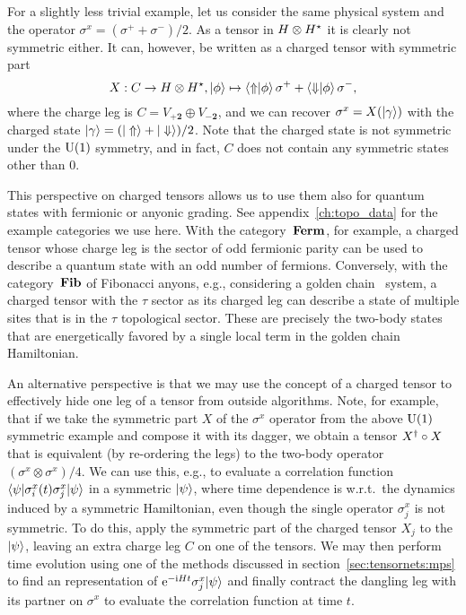 For a slightly less trivial example, let us consider the same physical system and the operator $\sigma^x = (\sigma^+ + \sigma^-) / 2$.
%
As a tensor in $H \otimes H^\star$ it is clearly not symmetric either.
%
It can, however, be written as a charged tensor with symmetric part
\begin{equation}
    X: C \to H \otimes \dualspace{H}, \ket{\phi} \mapsto \braket{\Uparrow}{\phi} \sigma^+ + \braket{\Downarrow}{\phi} \sigma^-
    ,
\end{equation}
where the charge leg is $C = V_{+\mathbf{2}} \oplus V_{-\mathbf{2}}$, and we can recover $\sigma^x = X(\ket{\gamma})$ with the charged state $\ket{\gamma} = (\ket{\Uparrow} + \ket{\Downarrow}) / 2$.
%
Note that the charged state is not symmetric under the $\mathrm{U}(1)$ symmetry, and in fact, $C$ does not contain any symmetric states other than $0$.

This perspective on charged tensors allows us to use them also for quantum states with fermionic or anyonic grading.
%
See appendix~\ref{ch:topo_data} for the example categories we use here.
%
With the category~$\mathbf{Ferm}$, for example, a charged tensor whose charge leg is the sector of odd fermionic parity can be used to describe a quantum state with an odd number of fermions.
%
Conversely, with the category~$\mathbf{Fib}$ of Fibonacci anyons, e.g., considering a golden chain~\cite{feiguin2007} system, a charged tensor with the $\tau$ sector as its charged leg can describe a state of multiple sites that is in the $\tau$ topological sector.
%
These are precisely the two-body states that are energetically favored by a single local term in the golden chain Hamiltonian.

An alternative perspective is that we may use the concept of a charged tensor to effectively hide one leg of a tensor from outside algorithms.
%
Note, for example, that if we take the symmetric part $X$ of the $\sigma^x$ operator from the above $\mathrm{U}(1)$ symmetric example and compose it with its dagger, we obtain a tensor $X^\dagger \circ X$ that is equivalent (by re-ordering the legs) to the two-body operator $(\sigma^x \otimes \sigma^x) / 4$.
%
We can use this, e.g., to evaluate a correlation function $\braopket{\psi}{\sigma^x_i(t) \sigma^x_j}{\psi}$ in a symmetric  $\psiket$, where time dependence is w.r.t.~the dynamics induced by a symmetric Hamiltonian, even though the single operator $\sigma^x_j$ is not symmetric.
%
To do this, apply the symmetric part of the charged tensor $X_j$ to the  $\psiket$, leaving an extra charge leg $C$ on one of the tensors.
%
We may then perform time evolution using one of the methods discussed in section~\ref{sec:tensornets:mps} to find an  representation of $\eto{-\im H t} \sigma^x_j \psiket$ and finally contract the dangling leg with its partner on $\sigma^x$ to evaluate the correlation function at time $t$.
